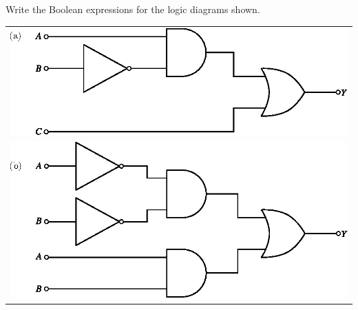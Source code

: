 \bigskip

\begin{example}\label{exam6.33}
Write the Boolean expressions for the logic diagrams shown.

\begin{tabular}[t]{l}
\includegraphics{chap6/fig119.eps}\\[17pt]
\includegraphics{chap6/fig120.eps}
\end{tabular}
\end{example}

\eject

